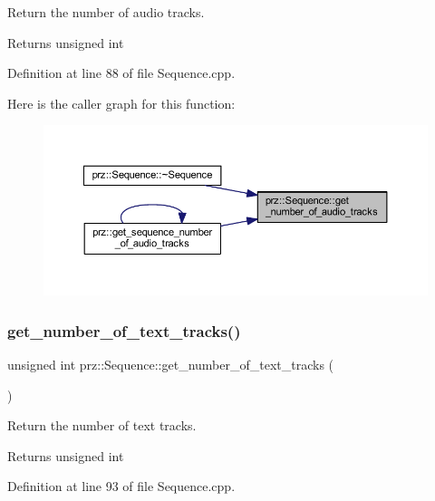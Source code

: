 Return the number of audio tracks. 

\begin{DoxyReturn}{Returns}
unsigned int 
\end{DoxyReturn}


Definition at line 88 of file Sequence.\+cpp.

Here is the caller graph for this function\+:
\nopagebreak
\begin{figure}[H]
\begin{center}
\leavevmode
\includegraphics[width=350pt]{classprz_1_1_sequence_a2d0ac9ea8804465100b36bb36a687799_icgraph}
\end{center}
\end{figure}
\mbox{\label{classprz_1_1_sequence_a1f00232c23dda0a52686d2012b6990c5}} 
\subsubsection{\texorpdfstring{get\_number\_of\_text\_tracks()}{get\_number\_of\_text\_tracks()}}
{\footnotesize\ttfamily unsigned int prz\+::\+Sequence\+::get\+\_\+number\+\_\+of\+\_\+text\+\_\+tracks (\begin{DoxyParamCaption}{ }\end{DoxyParamCaption})}



Return the number of text tracks. 

\begin{DoxyReturn}{Returns}
unsigned int 
\end{DoxyReturn}


Definition at line 93 of file Sequence.\+cpp.


